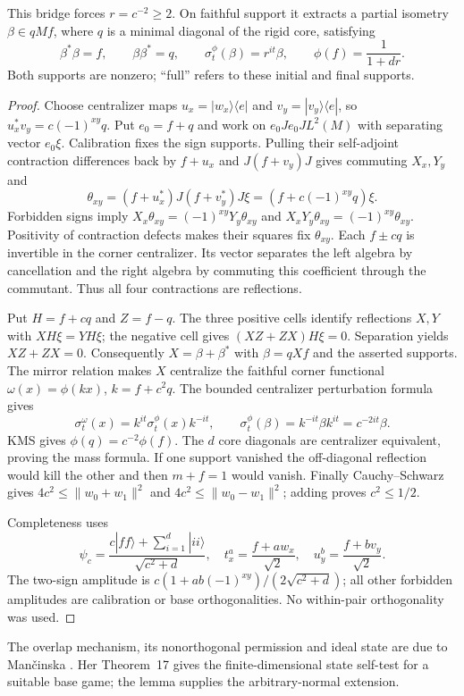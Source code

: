 \begin{lemma}\label{lem:overlap}
This bridge forces $r=c^{-2}\ge2$. On faithful support it extracts a partial isometry $\beta\in qMf$, where $q$ is a minimal diagonal of the rigid core, satisfying
\[
 \beta^*\beta=f,\qquad \beta\beta^*=q,\qquad
 \sigma_t^\phi(\beta)=r^{it}\beta,\qquad
 \phi(f)=\frac1{1+dr}.
\]
Both supports are nonzero; ``full'' refers to these initial and final supports.
\end{lemma}
\begin{proof}
Choose centralizer maps $u_x=|w_x\rangle\langle e|$ and $v_y=|v_y\rangle\langle e|$, so $u_x^*v_y=c(-1)^{xy}q$. Put $e_0=f+q$ and work on $e_0Je_0J L^2(M)$ with separating vector $e_0\xi$. Calibration fixes the sign supports. Pulling their self-adjoint contraction differences back by $f+u_x$ and $J(f+v_y)J$ gives commuting $X_x,Y_y$ and
\[
 \theta_{xy}=(f+u_x^*)J(f+v_y^*)J\xi
       =(f+c(-1)^{xy}q)\xi.
\]
Forbidden signs imply $X_x\theta_{xy}=(-1)^{xy}Y_y\theta_{xy}$ and $X_xY_y\theta_{xy}=(-1)^{xy}\theta_{xy}$. Positivity of contraction defects makes their squares fix $\theta_{xy}$. Each $f\pm cq$ is invertible in the corner centralizer. Its vector separates the left algebra by cancellation and the right algebra by commuting this coefficient through the commutant. Thus all four contractions are reflections.

Put $H=f+cq$ and $Z=f-q$. The three positive cells identify reflections $X,Y$ with $XH\xi=YH\xi$; the negative cell gives $(XZ+ZX)H\xi=0$. Separation yields $XZ+ZX=0$. Consequently $X=\beta+\beta^*$ with $\beta=qXf$ and the asserted supports. The mirror relation makes $X$ centralize the faithful corner functional $\omega(x)=\phi(kx)$, $k=f+c^2q$. The bounded centralizer perturbation formula \cite[Lemma 4.5]{PT} gives
\[
 \sigma_t^\omega(x)=k^{it}\sigma_t^\phi(x)k^{-it},\qquad
 \sigma_t^\phi(\beta)=k^{-it}\beta k^{it}=c^{-2it}\beta.
\]
KMS gives $\phi(q)=c^{-2}\phi(f)$. The $d$ core diagonals are centralizer equivalent, proving the mass formula. If one support vanished the off-diagonal reflection would kill the other and then $m+f=1$ would vanish. Finally Cauchy--Schwarz gives $4c^2\le\|w_0+w_1\|^2$ and $4c^2\le\|w_0-w_1\|^2$; adding proves $c^2\le1/2$.

Completeness uses
\[
 \psi_c=\frac{c|ff\rangle+\sum_{i=1}^d|ii\rangle}{\sqrt{c^2+d}},
 \quad t_x^a=\frac{f+aw_x}{\sqrt2},\quad
 u_y^b=\frac{f+bv_y}{\sqrt2}.
\]
The two-sign amplitude is $c(1+ab(-1)^{xy})/(2\sqrt{c^2+d})$; all other forbidden amplitudes are calibration or base orthogonalities. No within-pair orthogonality was used.
\end{proof}
The overlap mechanism, its nonorthogonal permission and ideal state are due to Man\v cinska \cite[Appendix C]{FMS}. Her Theorem~17 gives the finite-dimensional state self-test for a suitable base game; the lemma supplies the arbitrary-normal extension.

